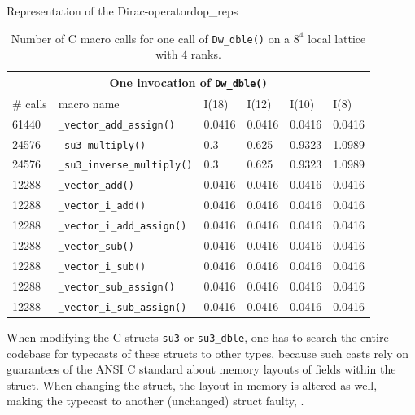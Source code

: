 \documentclass{article}
\theoremstyle{plain} %
\theoremstyle{convention} %
\theoremstyle{remark} %
\def\code#1{\texttt{#1}}
\numberwithin{equation}{section}
\begin{document}
\begin{proposal}{Representation of the Dirac-operator}{dop_reps}
\begin{table}[H]
\centering
    \begin{tabular}{ |p{1.2cm}|p{4cm}|p{1.2cm}|p{1.2cm}|p{1.2cm}|p{1.2cm}|  }
        \hline
        \multicolumn{6}{|c|}{One invocation of \code{Dw\_dble()}} \\
        \hline
        \# calls & macro name & I(18) & I(12) & I(10) & I(8) \\
        \hline
        61440 & \code{\_vector\_add\_assign()}    & 0.0416 & 0.0416 & 0.0416 & 0.0416 \\
        24576 & \code{\_su3\_multiply()}          & 0.3    & 0.625 & 0.9323 & 1.0989 \\
        24576 & \code{\_su3\_inverse\_multiply()} & 0.3    & 0.625 & 0.9323 & 1.0989 \\
        12288 & \code{\_vector\_add()}            & 0.0416 & 0.0416 & 0.0416 & 0.0416 \\
        12288 & \code{\_vector\_i\_add()}         & 0.0416 & 0.0416 & 0.0416 & 0.0416 \\
        12288 & \code{\_vector\_i\_add\_assign()} & 0.0416 & 0.0416 & 0.0416 & 0.0416 \\
        12288 & \code{\_vector\_sub()}            & 0.0416 & 0.0416 & 0.0416 & 0.0416 \\
        12288 & \code{\_vector\_i\_sub()}         & 0.0416 & 0.0416 & 0.0416 & 0.0416 \\
        12288 & \code{\_vector\_sub\_assign()}    & 0.0416 & 0.0416 & 0.0416 & 0.0416 \\
        12288 & \code{\_vector\_i\_sub\_assign()} & 0.0416 & 0.0416 & 0.0416 & 0.0416 \\
        \hline
    \end{tabular}
    \caption{Number of C macro calls for one call of \code{Dw\_dble()} on a $8^4$ local lattice with $4$ ranks.}
    \label{tab:dw_dble}
\end{table}

When modifying the C structs \code{su3} or \code{su3\_dble}, one has to search the entire codebase for typecasts of these structs to other types, because such casts rely on guarantees of the ANSI C standard about memory layouts of fields within the struct. When changing the struct, the layout in memory is altered as well, making the typecast to another (unchanged) struct faulty, \cite{siff1999}.

\end{proposal}
\end{document}
